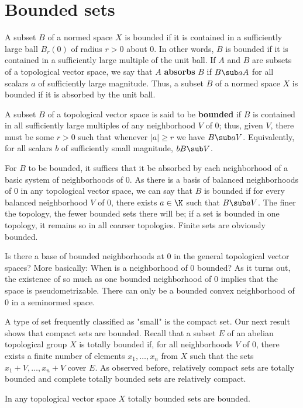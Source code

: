 \section{Bounded sets}
A subset $B$ of a normed space $X$ is bounded if it is contained in a sufficiently large ball $B_r(0)$ of radius $r>0$ about $0$. In other words, $B$ is bounded if it is contained in a sufficiently large multiple of the unit ball. If $A$ and $B$ are subsets of a topological vector space, we say that $A$ \textbf{absorbs} $B$ if $B\sub aA$ for all scalars $a$ of sufficiently large magnitude. Thus, a subset $B$ of a normed space $X$ is bounded if it is absorbed by the unit ball.
\begin{definition}
A subset $B$ of a topological vector space is said to be \textbf{bounded} if $B$ is contained in all sufficiently large multiples of any neighborhood $V$ of $0$; thus, given $V$, there must be some $r>0$ such that whenever $|a|\geq r$ we have $B\sub aV$. Equivalently, for all scalars $b$ of sufficiently small magnitude, $bB\sub V$.
\end{definition}
For $B$ to be bounded, it suffices that it be absorbed by each neighborhood of a basic system of neighborhoods of $0$. As there is a basis of balanced neighborhoods of $0$ in any topological vector space, we can say that $B$ is bounded if for every balanced neighborhood $V$ of $0$, there exists $a\in\K$ such that $B\sub aV$. The finer the topology, the fewer bounded sets there will be; if a set is bounded in one topology, it remains so in all coarser topologies. Finite sets are obviously bounded.\par
Is there a base of bounded neighborhoods at $0$ in the general topological vector spaces? More basically: When is a neighborhood of $0$ bounded? As it turns out, the existence of so much as one bounded neighborhood of $0$ implies that the space is pseudometrizable. There can only be a bounded convex neighborhood of $0$ in a seminormed space.\par
A type of set frequently classified as "small" is the compact set. Our next result shows that compact sets are bounded. Recall that a subset $E$ of an abelian topological group $X$ is totally bounded if, for all neighborhoods $V$ of $0$, there exists a finite number of elements $x_1,\dots,x_n$ from $X$ such that the sets $x_1+V,\dots,x_n+V$ cover $E$. As observed before, relatively compact sets are totally bounded and complete totally bounded sets are relatively compact.
\begin{proposition}\label{TVS totally bounded is bounded}
In any topological vector space $X$ totally bounded sets are bounded.
\end{proposition}
